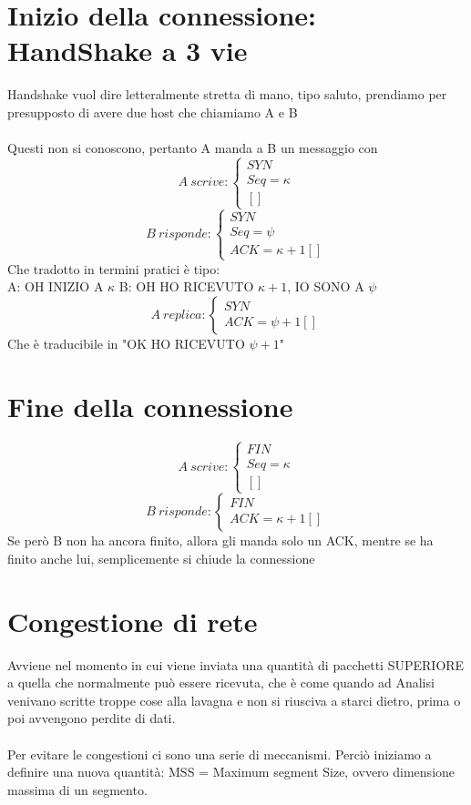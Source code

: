 \documentclass[12pt, a4paper, openany, twoside]{book}
\begin{document}
\section{Inizio della connessione: HandShake a 3 vie}
Handshake vuol dire letteralmente stretta di mano, tipo saluto, prendiamo
per presupposto di avere due host che chiamiamo A e B \\ \\
Questi non si conoscono, pertanto A manda a B un messaggio con
\[
A ~ scrive: \begin{cases}
SYN \\
Seq = \kappa \\
[]
\end{cases}
\]
\[
B ~ risponde: \begin{cases}
SYN \\
Seq = \psi \\
ACK = \kappa + 1
[] 
\end{cases}
\]
Che tradotto in termini pratici è tipo:	\\
A: OH INIZIO A $\kappa$
B: OH HO RICEVUTO $\kappa + 1$, IO SONO A $\psi$
\[
A ~ replica: \begin{cases}
SYN \\
ACK = \psi + 1
[] 
\end{cases}
\]
Che è traducibile in "OK HO RICEVUTO $\psi + 1$"
\section{Fine della connessione}
\[
A ~ scrive: \begin{cases}
FIN \\
Seq = \kappa \\
[]
\end{cases}
\]
\[
B ~ risponde: \begin{cases}
FIN \\
ACK = \kappa + 1
[] 
\end{cases}
\]
Se però B non ha ancora finito, allora gli manda solo un ACK, mentre
se ha finito anche lui, semplicemente si chiude la connessione
\section{Congestione di rete}
Avviene nel momento in cui viene inviata una quantità di pacchetti SUPERIORE a 
quella che normalmente può essere ricevuta, che è come quando ad Analisi venivano
scritte troppe cose alla lavagna e non si riusciva a starci dietro, prima o poi 
avvengono perdite di dati. \\ \\
Per evitare le congestioni ci sono una serie di meccanismi. Perciò iniziamo a 
definire una nuova quantità: MSS = Maximum segment Size, ovvero dimensione massima
di un segmento.
\end{document}
